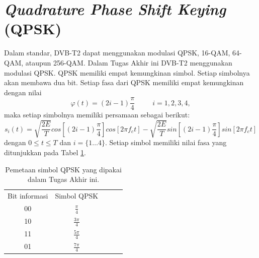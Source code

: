\section{\textit{Quadrature Phase Shift Keying} (QPSK)}
Dalam standar, DVB-T2 dapat menggunakan modulasi QPSK, 16-QAM, 64-QAM, ataupun 256-QAM. Dalam Tugas Akhir ini DVB-T2 menggunakan modulasi QPSK. QPSK memiliki empat kemungkinan simbol. Setiap simbolnya akan membawa dua bit. Setiap fasa dari QPSK memiliki empat kemungkinan dengan nilai 
\begin{equation}
\varphi (t)=(2i-1)\frac{\pi}{4} \;\;\;\;\;\;\;\;\; i=1,2,3,4, 
\label{eq:fasa QPSK}
\end{equation} 
maka setiap simbolnya memiliki persamaan sebagai berikut: 
\begin{equation}
s_{i}(t)=\sqrt{\frac{2E}{T}}cos\left [ (2i-1)\frac{\pi}{4}\right ] cos\left [ 2\pi f_{c}t \right ]-\sqrt{\frac{2E}{T}}sin\left [ (2i-1)\frac{\pi}{4}\right ]sin\left [ 2\pi f_{c}t \right ]
\label{eq:simbol QPSK}
\end{equation}
dengan $0\leq t\leq T$ dan $i=\{ 1\dots 4 \} $. Setiap simbol memiliki nilai fasa yang ditunjukkan pada Tabel \ref{tab:QPSK}.
\begin{table}
	\centering
	\caption{Pemetaan simbol QPSK yang dipakai dalam Tugas Akhir ini.}
	\begin{tabular}{|c|c|lll}
		\cline{1-2}
		Bit informasi & Simbol QPSK \\ \cline{1-2}
		00            &   $\frac{\pi}{4}$  \\ \cline{1-2}
		10            &   $\frac{3\pi}{4}$  \\ \cline{1-2}
		11            &   $\frac{5\pi}{4}$   \\ \cline{1-2}
		01            &   $\frac{7\pi}{4}$    \\ \cline{1-2}
	\end{tabular}
	\label{tab:QPSK}
\end{table}


